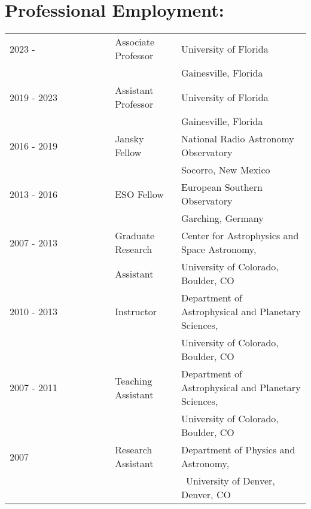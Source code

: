 \begin{minipage}{\textwidth}
\setlength{\extrarowheight}{2pt}
\section*{Professional Employment:}
\begin{listliketab}
    \begin{tabular}{lll}
    2023 -      &Associate Professor & University of Florida \\
                                     && Gainesville, Florida \\
    2019 - 2023 &Assistant Professor & University of Florida \\
                                     && Gainesville, Florida \\
    2016 - 2019 & Jansky Fellow  & National Radio Astronomy Observatory\\
                 &         & Socorro, New Mexico \\
    2013 - 2016 & ESO Fellow  & European Southern Observatory\\
                 &         & Garching, Germany \\
    2007 - 2013 & Graduate Research & Center for Astrophysics and Space Astronomy, \\
              &   Assistant         & University of Colorado, Boulder, CO \\
    2010 - 2013 & Instructor  & Department of Astrophysical and Planetary Sciences, \\
                           && University of Colorado, Boulder, CO \\
    2007 - 2011    & Teaching Assistant & Department of Astrophysical and Planetary Sciences, \\
                                    && University of Colorado, Boulder, CO \\
    2007 & Research Assistant & Department of Physics and Astronomy, \\
                                          && University of Denver, Denver, CO \\
    \end{tabular}
\end{listliketab}

\end{minipage}
